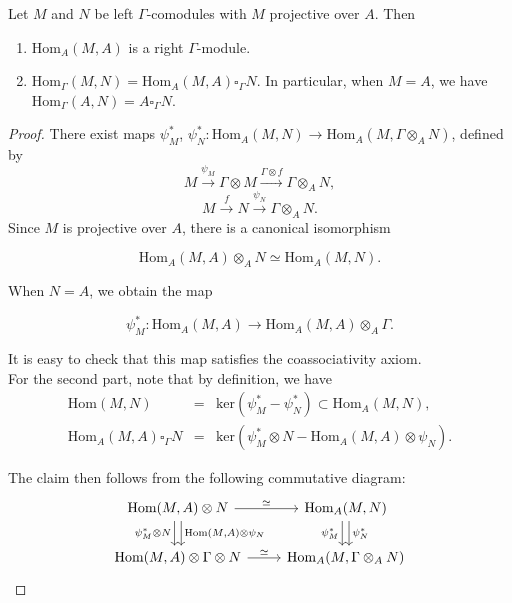 \begin{lemma}Let $ M$ and $ N$ be left $ \Gamma$-comodules with $ M$ projective over $ A$.  Then
\begin{enumerate}
\item $ \text{Hom}_A(M,A)$ is a right $ \Gamma$-module.
\item $ \text{Hom}_{\Gamma} (M, N) = \text{Hom}_A (M, A) \square_{\Gamma}N$.  In particular, when $ M = A$, we have $ \text{Hom}_{\Gamma}(A, N) = A \square_{\Gamma}N$.
\end{enumerate}
\end{lemma}
\begin{proof} There exist maps $ \psi_M^*$, $ \psi_N^*: \text{Hom}_A(M, N) \to \text{Hom}_A(M, \Gamma \otimes_A N)$, defined by
$$M \stackrel{\psi_M}{\longrightarrow} \Gamma \otimes M \stackrel{\Gamma \otimes f}{\longrightarrow} \Gamma \otimes_A N,$$
$$ M \stackrel{f}{\longrightarrow} N \stackrel{\psi_N}{\longrightarrow} \Gamma \otimes_A N.$$
Since $ M$ is projective over $ A$, there is a canonical isomorphism

$$\text{Hom}_A (M, A) \otimes_A N \simeq \text{Hom}_A(M, N).$$

When $ N = A$, we obtain the map

$$ \psi_M^*: \text{Hom}_A (M, A) \longrightarrow \text{Hom}_A(M, A) \otimes_A \Gamma.$$

It is easy to check that this map satisfies the coassociativity axiom. \\

For the second part, note that by definition, we have
$$\begin{array}{rll}
\text{Hom}(M, N) &=& \text{ker}(\psi_M^* - \psi_N^*) \subset \text{Hom}_A(M, N),\\
\text{Hom}_A(M, A) \square_{\Gamma} N &=& \text{ker}(\psi_M^* \otimes N - \text{Hom}_A(M, A) \otimes \psi_N). 
\end{array}$$

The claim then follows from the following commutative diagram:
$$\begin{tikzcd}
\text{Hom}(M, A) \otimes N \ar[r, "\simeq"] \ar[d, shift left, "\text{Hom}(M \text{,} A) \otimes \psi_N"] \ar[d, shift right, swap, "\psi^*_M \otimes N"] & \text{Hom}_A(M, N) \ar[d, shift left, "\psi_N^*"] \ar[d, shift right, swap, "\psi_M^*"] \\
\text{Hom}(M, A) \otimes \Gamma \otimes N  \ar[r, "\simeq"] & \text{Hom}_A(M, \Gamma \otimes_A N)
\end{tikzcd}$$

\end{proof}

